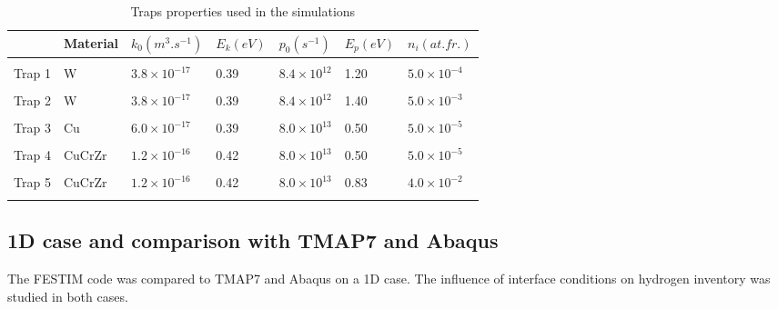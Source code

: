 \begin{table}
    \centering
    \begin{tabular}{L{1.5cm} L{1.5cm} R{1.6cm} R{1.1cm} R{1.6cm} R{1.1cm} R{2cm}}
         & Material & $k_0 (\si{m^3.s^{-1}})$ &  $E_k (\si{eV})$ & $p_0 (\si{s^{-1}})$ & $E_p (\si{eV})$ & $n_i (\si{at.fr.})$ \\
        \hline
        \\
        Trap 1 & W & $3.8 \times 10^{-17}$ & 0.39 & $8.4 \times 10^{12}$& 1.20 & $5.0 \times 10^{-4}$ \\
        \\
       Trap 2 & W & $3.8 \times 10^{-17}$ & 0.39 & $8.4 \times 10^{12}$& 1.40 & $5.0 \times 10^{-3}$ \\
        \\
        Trap 3 & Cu & $6.0 \times 10^{-17}$ & 0.39 & $8.0 \times 10^{13}$ & 0.50 &$5.0 \times 10^{-5}$\\
        \\
        Trap 4 & CuCrZr & $1.2\times 10^{-16}$ & 0.42 & $8.0 \times 10^{13}$ & 0.50 &$5.0 \times 10^{-5}$\\
        \\
        Trap 5 & CuCrZr & $1.2\times 10^{-16}$ & 0.42 & $8.0 \times 10^{13}$ & 0.83 &$4.0 \times 10^{-2}$\\
        \\
    \end{tabular}
    \caption{Traps properties used in the simulations \cite{hodille_macroscopic_2015, dolan_assessment_1994}}
    \label{tab:traps monoblock_1}
\end{table}


\subsection{1D case and comparison with TMAP7 and Abaqus}

The FESTIM code was compared to TMAP7  and Abaqus on a 1D case.
The influence of interface conditions on hydrogen inventory was studied in both cases.



